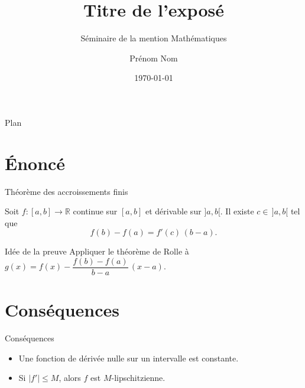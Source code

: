 \documentclass[aspectratio=169,11pt]{beamer}
\title{Titre de l'exposé}
\subtitle{Séminaire de la mention Mathématiques}
\author{Prénom Nom}
\institute{Université d'Antananarivo}
\date{\today}
\newcommand{\R}{\mathbb{R}}
\begin{document}
\begin{frame}
  \titlepage
\end{frame}

\begin{frame}{Plan}
  \tableofcontents
\end{frame}

\section{Énoncé}

\begin{frame}{Théorème des accroissements finis}
  \begin{theorem}
    Soit $f : [a,b] \to \R$ continue sur $[a,b]$ et dérivable sur $]a,b[$.
    Il existe $c \in \,]a,b[$ tel que
    \[ f(b) - f(a) = f'(c)\,(b - a). \]
  \end{theorem}
  \pause
  \begin{block}{Idée de la preuve}
    Appliquer le théorème de Rolle à
    $g(x) = f(x) - \dfrac{f(b) - f(a)}{b - a}\,(x - a)$.
  \end{block}
\end{frame}

\section{Conséquences}

\begin{frame}{Conséquences}
  \begin{itemize}
    \item<1-> Une fonction de dérivée nulle sur un intervalle est constante.
    \item<2-> Si $|f'| \leq M$, alors $f$ est $M$-lipschitzienne.
  \end{itemize}
\end{frame}
\end{document}
